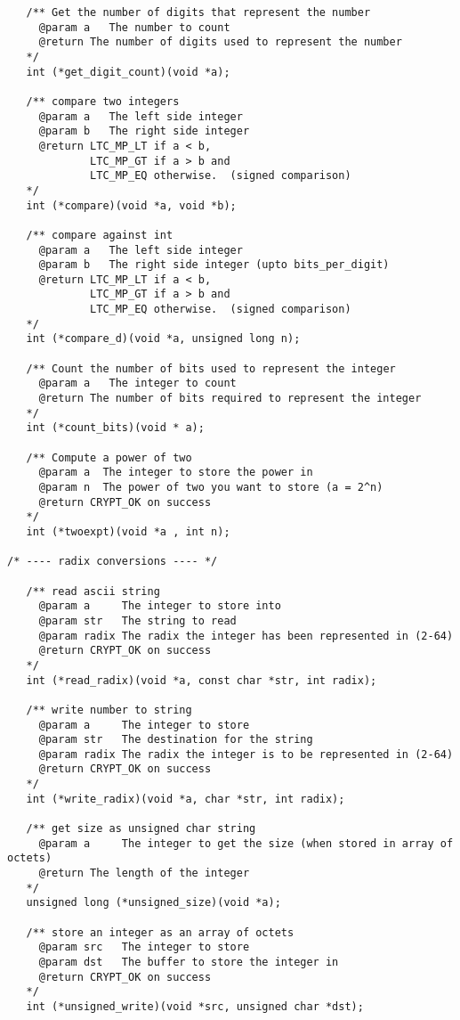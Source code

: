 \documentclass[a4paper]{book}
\begin{document}
\begin{small}
\begin{verbatim}
   /** Get the number of digits that represent the number
     @param a   The number to count
     @return The number of digits used to represent the number
   */
   int (*get_digit_count)(void *a);

   /** compare two integers
     @param a   The left side integer
     @param b   The right side integer
     @return LTC_MP_LT if a < b, 
             LTC_MP_GT if a > b and 
             LTC_MP_EQ otherwise.  (signed comparison)
   */
   int (*compare)(void *a, void *b);

   /** compare against int 
     @param a   The left side integer
     @param b   The right side integer (upto bits_per_digit)
     @return LTC_MP_LT if a < b, 
             LTC_MP_GT if a > b and 
             LTC_MP_EQ otherwise.  (signed comparison)
   */
   int (*compare_d)(void *a, unsigned long n);

   /** Count the number of bits used to represent the integer
     @param a   The integer to count
     @return The number of bits required to represent the integer
   */
   int (*count_bits)(void * a);

   /** Compute a power of two
     @param a  The integer to store the power in
     @param n  The power of two you want to store (a = 2^n)
     @return CRYPT_OK on success
   */
   int (*twoexpt)(void *a , int n);

/* ---- radix conversions ---- */
   
   /** read ascii string 
     @param a     The integer to store into
     @param str   The string to read
     @param radix The radix the integer has been represented in (2-64)
     @return CRYPT_OK on success
   */
   int (*read_radix)(void *a, const char *str, int radix);

   /** write number to string
     @param a     The integer to store
     @param str   The destination for the string
     @param radix The radix the integer is to be represented in (2-64)
     @return CRYPT_OK on success
   */
   int (*write_radix)(void *a, char *str, int radix);

   /** get size as unsigned char string 
     @param a     The integer to get the size (when stored in array of octets)
     @return The length of the integer
   */
   unsigned long (*unsigned_size)(void *a);

   /** store an integer as an array of octets 
     @param src   The integer to store
     @param dst   The buffer to store the integer in
     @return CRYPT_OK on success
   */
   int (*unsigned_write)(void *src, unsigned char *dst);


\end{verbatim}
\end{small}
\end{document}
